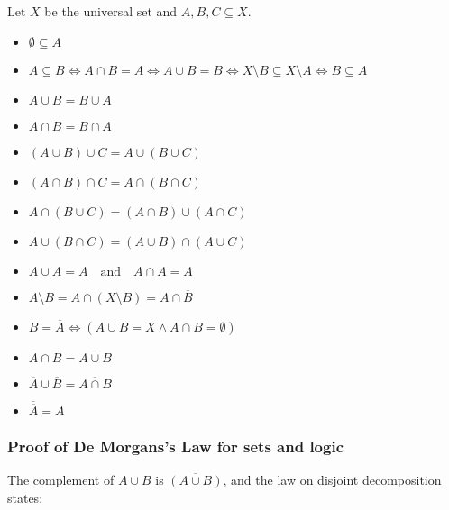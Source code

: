 Let \(X\) be the universal set and \(A, B, C \subseteq X\).

\begin{itemize}
	
	\item \(\emptyset \subseteq A\)
	
	\item \(A \subseteq B \iff A \cap B = A \iff A \cup B = B \iff X \setminus B \subseteq X 
		  \setminus A \iff B \subseteq A\)
	
	\item \(A \cup B = B \cup A\) 
	
	\item \(A \cap B = B \cap A\) 
	
	\item \((A \cup B) \cup C = A \cup (B \cup C)\) 
	
	\item \((A \cap B) \cap C = A \cap (B \cap C)\) 
	
	\item \(A \cap (B \cup C) = (A \cap B) \cup (A \cap C)\) 
	
	\item \(A \cup (B \cap C) = (A \cup B) \cap (A \cup C)\) 
		
	\item \(A \cup A = A \quad \text{and} \quad A \cap A = A\)
	
	\item \(A \setminus B = A \cap (X \setminus B) = A \cap \overline{B}\)
	
	\item \(B = \overline{A} \iff (A \cup B = X \land A \cap B = \emptyset)\) 
	
	\item \(\overline{A} \cap \overline{B} = \overline{A \cup B}\) 
	
	\item \(\overline{A} \cup \overline{B} = \overline{A \cap B}\) 
	
	\item \(\overline{\overline{A}} = A\)

\end{itemize}

\subsubsection{Proof of De Morgans's Law for sets and logic}

The complement of \( A \cup B \) is \( \overline{(A \cup B)} \), and the law on disjoint decomposition 
states:

